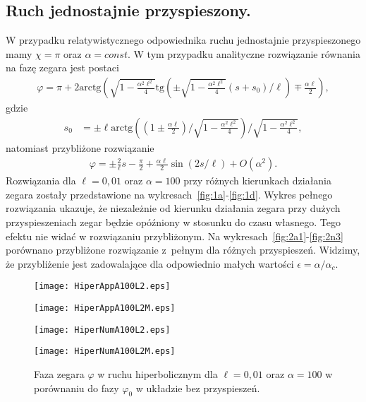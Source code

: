 \newpage
\subsection{Ruch jednostajnie przyspieszony.}
W przypadku relatywistycznego odpowiednika ruchu jednostajnie 
przyspieszonego mamy $\chi = \pi$ oraz $\alpha = const$.
W tym przypadku analityczne rozwiązanie 
równania na fazę zegara jest postaci
\begin{align*}
\varphi = \pi + 
2\text{arctg} \left( 
\sqrt{1-\frac{\alpha^2\ell^2}{4}} 
\text{tg} \left( \pm 
\sqrt{1-\frac{\alpha^2\ell^2}{4}} 
(s + s_0)/\ell\right)  \mp \frac{\alpha \ell}{2}
\right),
\end{align*}
gdzie
\begin{align*}
s_0 & = \pm \ell \text{arctg}  
\left( \left(1 \pm\frac{\alpha\ell}{2}\right) \Big / 
\sqrt{1-\frac{\alpha^2\ell^2}{4}}  \right)
\Big /\sqrt{1-\frac{\alpha^2\ell^2}{4}} ,
\end{align*}
natomiast przybliżone rozwiązanie 
\begin{align*}
\varphi =  \pm \frac{2}{\ell}s - \frac{\pi}{2} 
+ \frac{\alpha \ell}{2}  \sin (2 s / \ell  )  
+O(\alpha^2).
\end{align*}
Rozwiązania dla $\ell=0,01$ oraz $\alpha=100$ przy różnych 
kierunkach działania zegara 
zostały przedstawione na wykresach~\ref{fig:1a}-\ref{fig:1d}.
Wykres pełnego rozwiązania ukazuje, 
że niezależnie od kierunku działania zegara przy dużych 
przyspieszeniach zegar będzie opóźniony w stosunku do
czasu własnego. Tego efektu nie widać w rozwiązaniu przybliżonym.
Na wykresach~\ref{fig:2a1}-\ref{fig:2n3} porównano przybliżone rozwiązanie
 z~pełnym dla różnych przyspieszeń. 
Widzimy, że przybliżenie jest zadowalające dla odpowiednio małych 
wartości $\epsilon = \alpha / \alpha_c$.
\begin{figure}[h]
\begin{minipage}[b]{.5\linewidth}
\centering
\texttt{[image: HiperAppA100L2.eps]}
\label{fig:1a}
\end{minipage}%
\begin{minipage}[b]{.5\linewidth}
\centering
\texttt{[image: HiperAppA100L2M.eps]}
\label{fig:1b}
\end{minipage}
\begin{minipage}[b]{.5\linewidth}
\centering
\texttt{[image: HiperNumA100L2.eps]}
\label{fig:1c}
\end{minipage}%
\begin{minipage}[b]{.5\linewidth}
\centering
\texttt{[image: HiperNumA100L2M.eps]}
\label{fig:1d}
\end{minipage}
\caption{Faza zegara $\varphi$ w ruchu hiperbolicznym dla 
$\ell=0,01$ oraz $\alpha=100$ w porównaniu do fazy 
$\varphi_0$ w układzie bez przyspieszeń. }\label{fig:1}
\end{figure}
